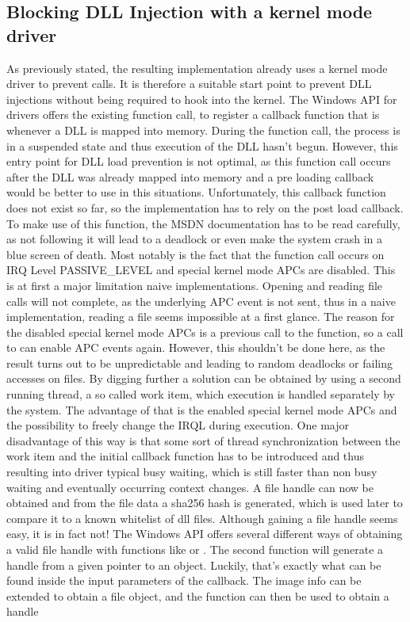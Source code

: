 \subsection{Blocking DLL Injection with a kernel mode driver}
As previously stated, the resulting implementation already uses a kernel mode driver to prevent  calls. It is therefore a suitable start point to prevent DLL injections without being required to hook into the kernel. The Windows API for drivers offers the existing  function call, to register a callback function that is whenever a DLL is mapped into memory. During the function call, the process is in a suspended state and thus execution of the DLL hasn't begun. However, this entry point for DLL load prevention is not optimal, as this function call occurs after the DLL was already mapped into memory and a pre loading callback would be better to use in this situations. Unfortunately, this callback function does not exist so far, so the implementation has to rely on the post load callback. To make use of this function, the MSDN documentation has to be read carefully, as not following it will lead to a deadlock or even make the system crash in a blue screen of death. Most notably is the fact that the function call occurs on IRQ Level PASSIVE\_LEVEL and special kernel mode APCs are disabled. This is at first a major limitation naive implementations. Opening and reading file calls will not complete, as the underlying APC event is not sent, thus in a naive implementation, reading a file seems impossible at a first glance. The reason for the disabled special kernel mode APCs is a previous call to the  function, so a call to  can enable APC events again. However, this shouldn't be done here, as the result turns out to be unpredictable and leading to random deadlocks or failing accesses on files. By digging further a solution can be obtained by using a second running thread, a so called work item, which execution is handled separately by the system. The advantage of that is the enabled special kernel mode APCs and the possibility to freely change the IRQL during execution. One major disadvantage of this way is that some sort of thread synchronization between the work item and the initial callback function has to be introduced and thus resulting into driver typical busy waiting, which is still faster than non busy waiting and eventually occurring context changes. A file handle can now be obtained and from the file data a sha256 hash is generated, which is used later to compare it to a known whitelist of dll files. Although gaining a file handle seems easy, it is in fact not! The Windows API offers several different ways of obtaining a valid file handle with functions like  or . The second function  will generate a handle from a given pointer to an object. Luckily, that's exactly what can be found inside the input parameters of the  callback. The image info can be extended to obtain a file object, and the  function can then be used to obtain a handle 